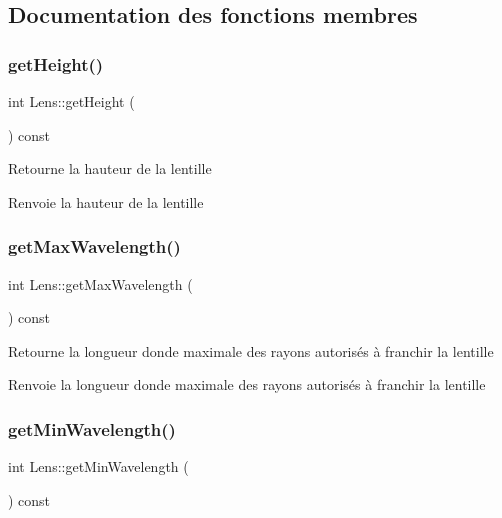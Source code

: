 \subsection{Documentation des fonctions membres}
\mbox{\label{class_lens_add1b885535031d16db3252748095a3ba}} 
\subsubsection{\texorpdfstring{getHeight()}{getHeight()}}
{\footnotesize\ttfamily int Lens\+::get\+Height (\begin{DoxyParamCaption}{ }\end{DoxyParamCaption}) const}

Retourne la hauteur de la lentille \begin{DoxyReturn}{Renvoie}
la hauteur de la lentille 
\end{DoxyReturn}
\mbox{\label{class_lens_ae4b3e16a607ae895c09b94a8beb7fdf3}} 
\subsubsection{\texorpdfstring{getMaxWavelength()}{getMaxWavelength()}}
{\footnotesize\ttfamily int Lens\+::get\+Max\+Wavelength (\begin{DoxyParamCaption}{ }\end{DoxyParamCaption}) const}

Retourne la longueur d\textquotesingle{}onde maximale des rayons autorisés à franchir la lentille \begin{DoxyReturn}{Renvoie}
la longueur d\textquotesingle{}onde maximale des rayons autorisés à franchir la lentille 
\end{DoxyReturn}
\mbox{\label{class_lens_a3aacfbf2cc2dcd7bef2927305c6038ff}} 
\subsubsection{\texorpdfstring{getMinWavelength()}{getMinWavelength()}}
{\footnotesize\ttfamily int Lens\+::get\+Min\+Wavelength (\begin{DoxyParamCaption}{ }\end{DoxyParamCaption}) const}

